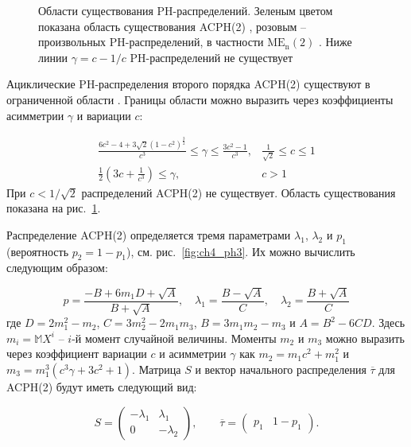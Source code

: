 \begin{figure}[h]
  \caption{Области существования PH-распределений. Зеленым цветом показана область существования ACPH(2) \cite{Telek2003}, розовым -- произвольных PH-распределений, в частности $\text{ME}_\text{n}(2)$ \cite{Johnson1989}. Ниже линии $\gamma = c - 1/c$ PH-распределений не существует}
  \label{fig:ch4_ph_feasible_regions}
\end{figure}

Ациклические PH-распределения второго порядка ACPH(2) существуют в ограниченной области \cite{Telek2003}. Границы области можно выразить через коэффициенты асимметрии $\gamma$ и вариации $c$:

\begin{equation}
    \label{eq:ch4_acph2_existance}
    \begin{matrix}
        \frac{6c^2 - 4 + 3\sqrt{2}(1 - c^2)^{\frac{3}{2}}}{c^3} \leqslant \gamma \leqslant \frac{3c^2 - 1}{c^3}, & \frac{1}{\sqrt{2}} \leqslant c \leqslant 1\\
        \frac{1}{2}(3c + \frac{1}{c^3}) \leqslant \gamma, & c > 1
    \end{matrix}
\end{equation}
При $c < 1/\sqrt{2}$ распределений ACPH(2) не существует. Область существования показана на рис.~\ref{fig:ch4_ph_feasible_regions}.

Распределение ACPH(2) определяется тремя параметрами $\lambda_1$, $\lambda_2$ и $p_1$ (вероятность $p_2 = 1 - p_1$), см. рис.~\ref{fig:ch4_ph3}. Их можно вычислить следующим  образом:

\begin{equation}
    \label{eq:ch4_acph2_params}
    p = \frac{-B + 6 m_1 D + \sqrt{A}}{B + \sqrt{A}}, \quad
    \lambda_{1} = \frac{B - \sqrt{A}}{C}, \quad
    \lambda_{2} = \frac{B + \sqrt{A}}{C}
\end{equation}
где $D = 2m_1^2 - m_2$, $C = 3 m_2^2 - 2 m_1 m_3$, $B = 3 m_1 m_2 - m_3$ и $A = B^2 - 6 C D$. Здесь $m_i = \mathbb{M}X^i$ -- $i$-й момент случайной величины. Моменты $m_2$ и $m_3$ можно выразить через коэффициент вариации $c$ и асимметрии $\gamma$ как $m_2 = m_1 c^2 + m_1^2$ и $m_3 = m_1^3 (c^3 \gamma + 3 c^2 + 1)$. Матрица $S$ и вектор начального распределения $\overline{\tau}$ для ACPH(2) будут иметь следующий вид:

\begin{equation}
    \label{eq:ch4_acph2_ph_tau}
    S = \left(\begin{matrix}
        -\lambda_1 & \lambda_1 \\
        0 & -\lambda_2
    \end{matrix}\right),
    \qquad
    \overline{\tau} = \left(\begin{matrix}
        p_1 & 1 - p_1
    \end{matrix}\right).
\end{equation}


